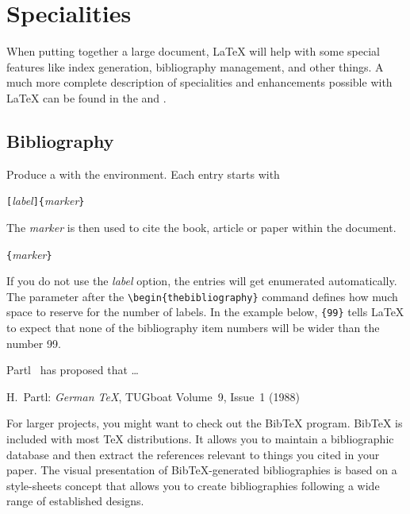 
\chapter{Specialities}
\begin{intro}
  When putting together a large document, \LaTeX{} will help
  with some special features like index generation,
  bibliography management, and other things.
  A much more complete description of specialities and
  enhancements possible with \LaTeX{} can be found in the
  {\normalfont\manual{}} and {\normalfont \companion}.
\end{intro}


\section{Bibliography}

Produce a  with the 
environment.  Each entry starts with
\begin{lscommand}
\verb|[|\emph{label}\verb|]{|\emph{marker}\verb|}|
\end{lscommand}
The \emph{marker} is then used to cite the book, article or paper
within the document.
\begin{lscommand}
\verb|{|\emph{marker}\verb|}|
\end{lscommand}
If you do not use the \emph{label} option, the entries will get enumerated
automatically.  The parameter after the \verb|\begin{thebibliography}|
command defines how much space to reserve for the number of labels. In the example below,
\verb|{99}| tells \LaTeX{} to expect that none of the bibliography item numbers will be wider
than the number 99.
\begin{example}[standalone, paperwidth=7cm, paperheight=4cm]
Partl~\cite{pa} has
proposed that \ldots
\begin{thebibliography}{99}
 H.~Partl:
\emph{German \TeX},
TUGboat Volume~9, Issue~1 (1988)
\end{thebibliography}
\end{example}

For larger projects, you might want to check out the Bib\TeX{}
program. Bib\TeX{} is included with most \TeX{} distributions. It
allows you to maintain a bibliographic database and then extract the
references relevant to things you cited in your paper. The visual
presentation of Bib\TeX{}-generated bibliographies is based on a style-sheets concept that allows you to create bibliographies following
a wide range of established designs.

